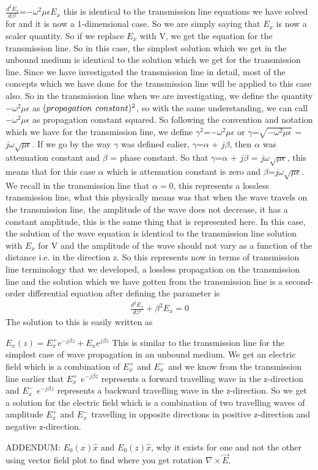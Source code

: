 $\frac{d^2 E_x}{d z^2}$=$-\omega^2\mu\epsilon E_{x}$ this is identical to the transmission line equations we have solved for and it is now a 1-dimensional case. So we are simply saying that $E_x$ is now a scaler quantity. So if we replace $E_x$ with V, we get the equation for the transmission line. So in this case, the simplest solution which we get in the unbound medium is identical to the solution which we get for the transmission line. Since we have investigated the transmission line in detail, most of the concepts which we have done for the transmission line will be applied to this case also. So in the transmission line when we are investigating, we define the quantity $-\omega^2\mu\epsilon$ as $(propagation\hspace{0.15cm} constant)^2$, so with the same understanding, we can call $-\omega^2\mu\epsilon$ as propagation constant squared. So following the convention and notation which we have for the transmission line, we define $\gamma^2$=$-\omega^2\mu\epsilon$ or $\gamma$=$\sqrt{-\omega^2\mu\epsilon}$ = $j\omega\sqrt{\mu\epsilon}$. If we go by the way $\gamma$ was defined ealier, $\gamma$=$\alpha$ + $j\beta$, then $\alpha$ was attenuation constant and $\beta$ = phase constant. So that $\gamma$=$\alpha$ + $j\beta$ = $j\omega\sqrt{\mu\epsilon}$, this means that for this case $\alpha$ which is attenuation constant is zero and  $\beta$=$j\omega\sqrt{\mu\epsilon}$.
We recall in the transmission line that $\alpha=0$, this represents a lossless transmission line, what this physically means was that when the wave travels on the transmission line, the amplitude of the wave does not decrease, it has a constant amplitude, this is the same thing that is represented here. In this case, the solution of the wave equation is identical to the transmission line solution with $E_x$ for V and the amplitude of the wave should not vary as a function of the distance i.e. in the direction z. So this represents now in terms of transmission line terminology that we developed, a lossless propagation on the transmission line and the solution which we have gotten from the transmission line is a second-order differential equation after defining the parameter is
\begin{align}
\frac{d^2E_x}{dz^2}+\beta^2E_x=0
\end{align}
The solution to this is easily written as

$E_x(z)=E^+_xe^{-j\beta z}+E_xe^{j\beta z}$ This is similar to the transmission line for the simplest case of wave propagation in an unbound medium.
We get an electric field which is a combination of $E_x^+$ and $E_x^-$ and we know from the transmission line earlier that $E_x^+$ $e^{-j\beta z}$ represents a forward travelling wave in the z-direction and $E_x^-$ $e^{-j\beta z}$ represents a backward travelling wave in the z-direction. So we get a solution for the electric field which is a combination of two travelling waves of amplitude $E_x^+$ and $E_x^-$ travelling in opposite directions in positive z-direction and negative z-direction.

ADDENDUM: $E_0(x)\hat{x}$ and $E_0(z)\hat{x}$, why it exists for one and not the other using vector field plot to find where you get rotation $\nabla\times\vec{E}$.
